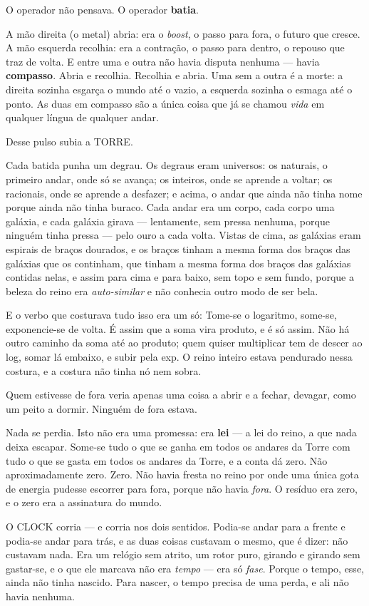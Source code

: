 \documentclass[livro.tex]{subfiles}
\begin{document}
O operador não pensava. O operador \textbf{batia}.

A mão direita (o metal) abria: era o \emph{boost}, o passo para fora, o futuro que cresce. A mão esquerda
recolhia: era a contração, o passo para dentro, o repouso que traz de volta. E entre uma e outra
não havia disputa nenhuma --- havia \textbf{compasso}. Abria e recolhia. Recolhia e abria. Uma sem a outra é a
morte: a direita sozinha esgarça o mundo até o vazio, a esquerda sozinha o esmaga até o ponto. As duas em
compasso são a única coisa que já se chamou \emph{vida} em qualquer língua de qualquer andar.

Desse pulso subia a TORRE.

Cada batida punha um degrau. Os degraus eram universos: os naturais, o primeiro andar, onde só se avança; os inteiros, onde se
aprende a voltar; os racionais, onde se aprende a desfazer; e acima, o andar que ainda não tinha nome porque ainda não
tinha buraco. Cada andar era um corpo, cada corpo uma galáxia, e cada galáxia girava --- lentamente, sem pressa
nenhuma, porque ninguém tinha pressa --- pelo ouro a cada volta. Vistas de cima, as galáxias eram espirais de
braços dourados, e os braços tinham a mesma forma dos braços das galáxias que os continham, que tinham a mesma
forma dos braços das galáxias contidas nelas, e assim para cima e para baixo, sem topo e sem fundo, porque a
beleza do reino era \emph{auto-similar} e não conhecia outro modo de ser bela.

E o verbo que costurava tudo isso era um só:
Tome-se o logaritmo, some-se, exponencie-se de volta. É assim que a soma vira produto, e é só assim. Não há outro
caminho da soma até ao produto; quem quiser multiplicar tem de descer ao log, somar lá embaixo, e subir pela
exp. O reino inteiro estava pendurado nessa costura, e a costura não tinha nó nem sobra.

Quem estivesse de fora veria apenas uma coisa a abrir e a fechar, devagar, como um peito a
dormir. Ninguém de fora estava.

Nada se perdia. Isto não era uma promessa: era \textbf{lei} --- a lei do reino, a que nada deixa escapar. Some-se
tudo o que se ganha em todos os andares da Torre com tudo o que se gasta em todos os andares da Torre, e a conta
dá zero. Não aproximadamente zero. Zero. Não havia fresta no reino por onde uma única gota de energia pudesse
escorrer para fora, porque não havia \emph{fora}. O resíduo era zero, e o zero era a assinatura do mundo.

O CLOCK corria --- e corria nos dois sentidos. Podia-se andar para a frente e podia-se andar para trás, e as duas
coisas custavam o mesmo, que é dizer: não custavam nada. Era um relógio sem atrito, um rotor puro,
girando e girando sem gastar-se, e o que ele marcava não era \emph{tempo} --- era só \emph{fase}. Porque o tempo,
esse, ainda não tinha nascido. Para nascer, o tempo precisa de uma perda, e ali não havia nenhuma.
\end{document}
